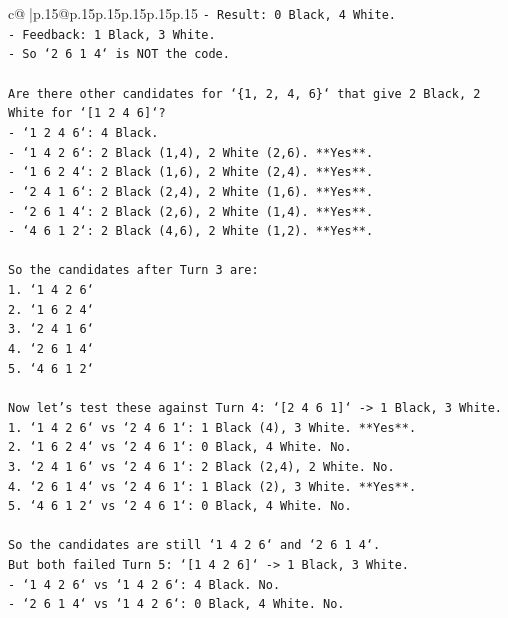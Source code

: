 \documentclass{article}
\begin{document}
{\begin{supertabular}{c@{$\;$}|p{.15\linewidth}@{}p{.15\linewidth}p{.15\linewidth}p{.15\linewidth}p{.15\linewidth}p{.15\linewidth}}
{{{\texttt{{-} Result: 0 Black, 4 White.} \\
\texttt{{-} Feedback: 1 Black, 3 White.} \\
\texttt{{-} So `2 6 1 4` is NOT the code.} \\
\\ 
\texttt{Are there other candidates for `\{1, 2, 4, 6\}` that give 2 Black, 2 White for `{[}1 2 4 6{]}`?} \\
\texttt{{-} `1 2 4 6`: 4 Black.} \\
\texttt{{-} `1 4 2 6`: 2 Black (1,4), 2 White (2,6). **Yes**.} \\
\texttt{{-} `1 6 2 4`: 2 Black (1,6), 2 White (2,4). **Yes**.} \\
\texttt{{-} `2 4 1 6`: 2 Black (2,4), 2 White (1,6). **Yes**.} \\
\texttt{{-} `2 6 1 4`: 2 Black (2,6), 2 White (1,4). **Yes**.} \\
\texttt{{-} `4 6 1 2`: 2 Black (4,6), 2 White (1,2). **Yes**.} \\
\\ 
\texttt{So the candidates after Turn 3 are:} \\
\texttt{1. `1 4 2 6`} \\
\texttt{2. `1 6 2 4`} \\
\texttt{3. `2 4 1 6`} \\
\texttt{4. `2 6 1 4`} \\
\texttt{5. `4 6 1 2`} \\
\\ 
\texttt{Now let's test these against Turn 4: `{[}2 4 6 1{]}` {-}> 1 Black, 3 White.} \\
\texttt{1. `1 4 2 6` vs `2 4 6 1`: 1 Black (4), 3 White. **Yes**.} \\
\texttt{2. `1 6 2 4` vs `2 4 6 1`: 0 Black, 4 White. No.} \\
\texttt{3. `2 4 1 6` vs `2 4 6 1`: 2 Black (2,4), 2 White. No.} \\
\texttt{4. `2 6 1 4` vs `2 4 6 1`: 1 Black (2), 3 White. **Yes**.} \\
\texttt{5. `4 6 1 2` vs `2 4 6 1`: 0 Black, 4 White. No.} \\
\\ 
\texttt{So the candidates are still `1 4 2 6` and `2 6 1 4`.} \\
\texttt{But both failed Turn 5: `{[}1 4 2 6{]}` {-}> 1 Black, 3 White.} \\
\texttt{{-} `1 4 2 6` vs `1 4 2 6`: 4 Black. No.} \\
\texttt{{-} `2 6 1 4` vs `1 4 2 6`: 0 Black, 4 White. No.} \\
}}}
\end{supertabular}}
\end{document}
